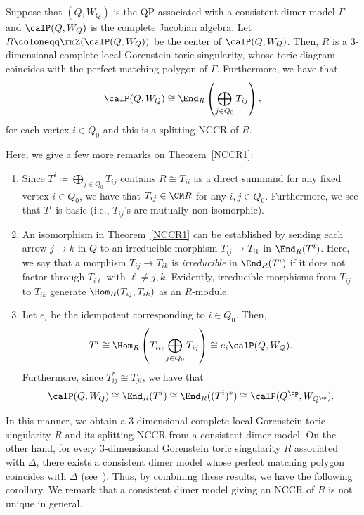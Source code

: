 \begin{theo}\label{NCCR1}
Suppose that $(Q, W_Q)$ is the QP associated with a consistent dimer model $\Gamma$ and $\calP(Q, W_Q)$ is the complete Jacobian algebra. Let $R\coloneqq \rmZ(\calP(Q, W_Q))$ be the center of $\calP(Q, W_Q)$. Then, $R$ is a $3$-dimensional complete local Gorenstein toric singularity, whose toric diagram coincides with the perfect matching polygon of $\Gamma$. Furthermore, we have that
\[
\calP(Q, W_Q)\cong\End_R\left(\bigoplus_{j\in Q_0}T_{ij}\right),
\]
for each vertex $i\in Q_0$ and this is a splitting NCCR of $R$.
\end{theo}


\begin{rema}\label{rem_NCCR}
Here, we give a few more remarks on Theorem~\ref{NCCR1}:
\begin{enumerate}%
\item Since $T^i\coloneqq\bigoplus_{j\in Q_0}T_{ij}$ contains $R\cong T_{ii}$ as a direct summand for any fixed vertex $i\in Q_0$, we have that $T_{ij}\in\CM R$ for any $i, j \in Q_0$. Furthermore, we see that $T^i$ is basic (i.e., $T_{ij}$'s are mutually non-isomorphic).

\item An isomorphism in Theorem~\ref{NCCR1} can be established by sending each arrow $j\rightarrow k$ in $Q$ to an irreducible morphism $T_{ij}\rightarrow T_{ik}$ in $\End_R(T^i)$. Here, we say that a morphism $T_{ij}\rightarrow T_{ik}$ is \emph{irreducible} in $\End_R(T^i)$ if it does not factor through $T_{i\ell}$ with $\ell\neq j,k$. Evidently, irreducible morphisms from $T_{ij}$ to $T_{ik}$ generate $\Hom_R(T_{ij},T_{ik})$ as an $R$-module.

\item Let $e_i$ be the idempotent corresponding to $i\in Q_0$. Then,
\[
T^i\cong\Hom_R\left(T_{ii},\bigoplus_{j\in Q_0}T_{ij}\right)\cong e_i\calP(Q, W_Q).
\]
Furthermore, since $T_{ij}^* \cong T_{ji}$, we have that
\[
\calP(Q, W_Q)\cong\End_R(T^i)\cong\End_R((T^i)^*)\cong\calP(Q^{\op}, W_{Q^{\op}}).
\]
\end{enumerate}
\end{rema}

In this manner, we obtain a $3$-dimensional complete local Gorenstein toric singularity $R$ and its splitting NCCR from a consistent dimer model. On the other hand, for every $3$-dimensional Gorenstein toric singularity $R$ associated with $\Delta$, there exists a consistent dimer model whose perfect matching polygon coincides with $\Delta$ (see~\cite{Gul,IU2}). Thus, by combining these results, we have the following corollary. We remark that a consistent dimer model giving an NCCR of $R$ is not unique in general.

